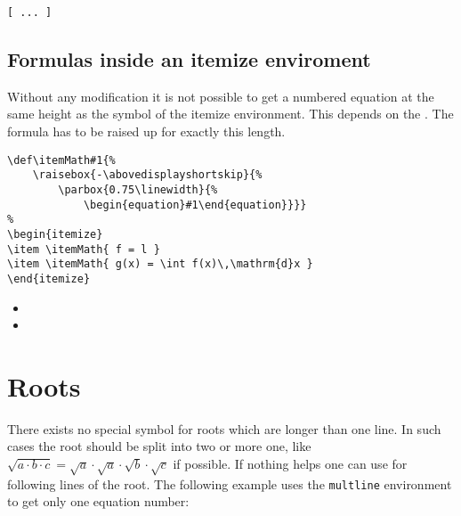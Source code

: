 \begin{table}[htb]
\begin{lstlisting}[tabsize=4]
[ ... ]
\end{lstlisting}

\subsection[Itemize environment]{Formulas inside an itemize enviroment}\label{sec:itemize}
Without any modification it is not possible to get a numbered equation
at the same height as the symbol of the itemize environment. This depends on    %
the . The formula has to be raised up for exactly this length.

\begin{lstlisting}
\def\itemMath#1{%
    \raisebox{-\abovedisplayshortskip}{%
        \parbox{0.75\linewidth}{%
            \begin{equation}#1\end{equation}}}}
%
\begin{itemize}
\item \itemMath{ f = l }
\item \itemMath{ g(x) = \int f(x)\,\mathrm{d}x }
\end{itemize}
\end{lstlisting}

\def\itemMath#1{%
    \raisebox{-\abovedisplayshortskip}{%
        \parbox{0.75\linewidth}{%
            \begin{equation}#1\end{equation}}}}
%
\begin{itemize}
\item \itemMath{ f = l }
\item \itemMath{ g(x) = \int f(x)\,\mathrm{d}x }
\end{itemize}


\section{Roots}
There exists no special symbol for roots which are longer than one line. In such
cases the root should be split into two or more one, like $\sqrt{a\cdot b\cdot c}=\sqrt{a}\cdot\sqrt{a}\cdot\sqrt{b}\cdot\sqrt{c}$
if possible. If nothing helps one can use  for 
following lines of the root. The following example uses the \verb+multline+ environment
to get only one equation number:


\end{table}
